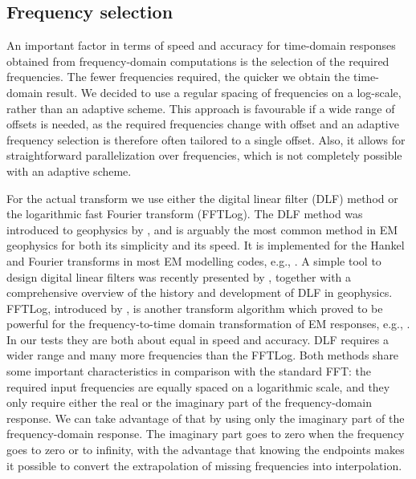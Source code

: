 \documentclass[extra, camera,%
    final,       %
]{gji}
\begin{document}
\subsection{Frequency selection}  %

An important factor in terms of speed and accuracy for time-domain responses
obtained from frequency-domain computations is the selection of the required
frequencies. The fewer frequencies required, the quicker we obtain the
time-domain result.  We decided to use a regular spacing of frequencies on a
log-scale, rather than an adaptive scheme. This approach is favourable if a
wide range of offsets is needed, as the required frequencies change with offset
and an adaptive frequency selection is therefore often tailored to a single
offset. Also, it allows for straightforward parallelization over frequencies,
which is not completely possible with an adaptive scheme.

For the actual transform we use either the digital linear filter (DLF) method
or the logarithmic fast Fourier transform (FFTLog). The DLF method was
introduced to geophysics by \cite{GP.71.Ghosh}, and is arguably the most common
method in EM geophysics for both its simplicity and its speed. It is
implemented for the Hankel and Fourier transforms in most EM modelling codes,
e.g., \cite{GEO.09.Key}. A simple tool to design digital linear filters was
recently presented by \cite{GEO.19.Werthmuller}, together with a comprehensive
overview of the history and development of DLF in geophysics. FFTLog,
introduced by \cite{RAS.00.Hamilton}, is another transform algorithm which
proved to be powerful for the frequency-to-time domain transformation of EM
responses, e.g., \cite{INT.14.Werthmuller}. In our tests they are both about
equal in speed and accuracy. DLF requires a wider range and many more
frequencies than the FFTLog. Both methods share some important characteristics
in comparison with the standard FFT: the required input frequencies are equally
spaced on a logarithmic scale, and they only require either
the real or the imaginary part of the frequency-domain response. We can take
advantage of that by using only the imaginary part of the frequency-domain
response. The imaginary part goes to zero when the frequency goes
 to zero or to infinity, with the advantage that knowing the
endpoints makes it possible to convert the extrapolation of missing frequencies
into interpolation.
\end{document}
